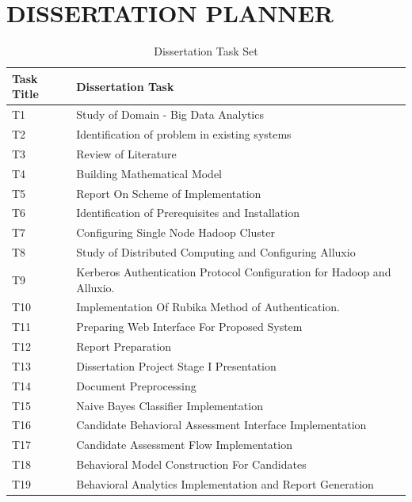 \documentclass[oneside,a4paper,12pt]{pictreport}
\begin{document}
\chapter{DISSERTATION PLANNER}
\renewcommand{\arraystretch}{1.5}
\begin{table}[]
\centering
\caption{Dissertation Task Set}
\label{my-label}
\begin{tabular}{|l|l|}
\hline
\textbf{Task Title} & \textbf{Dissertation Task}                    \\ \hline
T1                  & Study of Domain - Big Data Analytics          \\ \hline
T2                  & Identification of problem in existing systems \\ \hline
T3                  & Review of Literature \\ 
\hline
T4                  & Building Mathematical Model \\ 
\hline
T5                  & Report On Scheme of Implementation \\ \hline
T6                  & Identification of Prerequisites and Installation \\ \hline
T7                  & Configuring Single Node Hadoop Cluster \\ \hline
T8                  & Study of Distributed Computing and Configuring Alluxio \\ \hline
T9                  & Kerberos Authentication Protocol Configuration for Hadoop and Alluxio. \\ \hline
T10                  & Implementation Of Rubika Method of Authentication. \\ \hline
T11                  & Preparing Web Interface For Proposed System \\ \hline
T12                  & Report Preparation \\ \hline
T13                  & Dissertation Project Stage I Presentation \\ \hline
T14                  & Document Preprocessing
 \\ \hline
T15                  & Naive Bayes Classifier Implementation
 \\ \hline
T16                  & Candidate Behavioral Assessment Interface Implementation \\ \hline
T17                  & Candidate Assessment Flow Implementation \\ \hline
T18                  & Behavioral Model Construction For Candidates \\ \hline
T19                  & Behavioral Analytics Implementation and Report Generation

\end{tabular}
\end{table}
\end{document}
